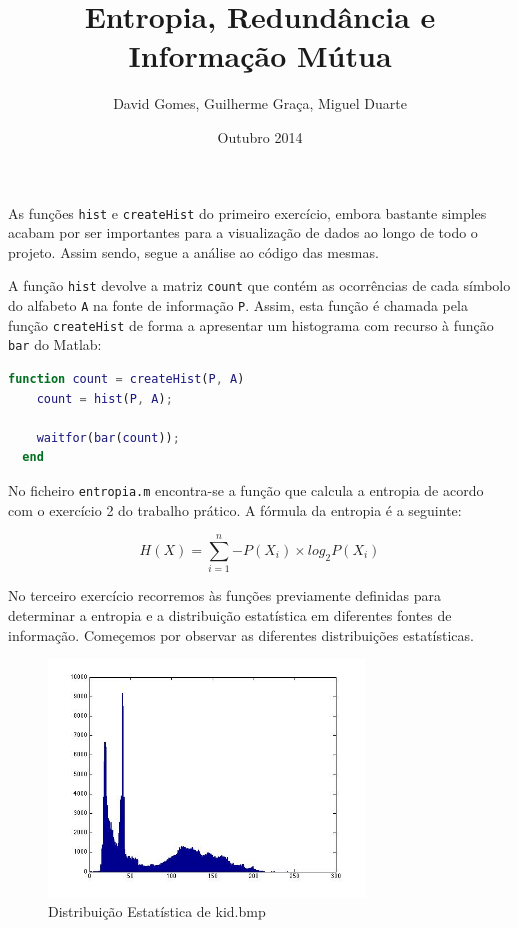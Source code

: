\documentclass[12pt]{article}
\title{Entropia, Redundância e Informação Mútua}
\author{David Gomes, Guilherme Graça, Miguel Duarte}
\date{Outubro 2014}
\begin{document}
\maketitle
  As funções \texttt{hist} e \texttt{createHist} do primeiro exercício, embora bastante
  simples acabam por ser importantes para a visualização de dados ao longo
  de todo o projeto. Assim sendo, segue a análise ao código das mesmas.

  A função \texttt{hist} devolve a matriz \texttt{count} que contém as ocorrências
  de cada símbolo do alfabeto \texttt{A} na fonte de informação \texttt{P}. Assim,
  esta função é chamada pela função \texttt{createHist} de forma a apresentar um histograma
  com recurso à função \texttt{bar} do Matlab:

  \vspace{2mm}
  \begin{lstlisting}[language=Matlab]
  function count = createHist(P, A)
    count = hist(P, A);

    waitfor(bar(count));
  end
  \end{lstlisting}

  No ficheiro \texttt{entropia.m} encontra-se a função que calcula a entropia de acordo
  com o exercício 2 do trabalho prático. A fórmula da entropia é a seguinte:

  $$
    H(X) = \sum_{i=1}^{n}{-P(X_i) \times log_2 P(X_i)}
  $$

  No terceiro exercício recorremos às funções previamente definidas para determinar
  a entropia e a distribuição estatística em diferentes fontes de informação.
  Começemos por observar as diferentes distribuições estatísticas.

  \begin{figure}[H]
    \centering
      \includegraphics[width=0.75\textwidth]{ex3kid}
    \caption{Distribuição Estatística de kid.bmp}
  \end{figure}
\end{document}
